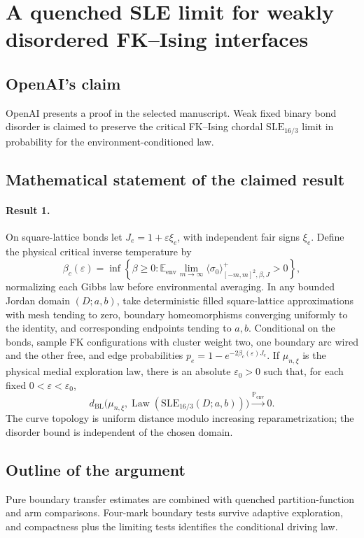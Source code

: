 \documentclass[11pt]{article}
\begin{document}
\section*{A quenched SLE limit for weakly disordered FK–Ising interfaces}

\subsection{OpenAI's claim}
OpenAI presents a proof in the selected manuscript. Weak fixed binary bond disorder is claimed to preserve the critical FK--Ising chordal $\mathrm{SLE}_{16/3}$ limit in probability for the environment-conditioned law.

\subsection{Mathematical statement of the claimed result}
\paragraph{Result 1.} On square-lattice bonds let $J_e=1+\varepsilon\xi_e$, with independent fair signs $\xi_e$. Define the physical critical inverse temperature by
\[
 \beta_c(\varepsilon)=\inf\left\{\beta\ge0:
 \mathbb E_{\mathrm{env}}\lim_{m\to\infty}\langle\sigma_0\rangle^+_{[-m,m]^2,\beta,J}>0\right\},
\]
normalizing each Gibbs law before environmental averaging. In any bounded Jordan domain $(D;a,b)$, take deterministic filled square-lattice approximations with mesh tending to zero, boundary homeomorphisms converging uniformly to the identity, and corresponding endpoints tending to $a,b$. Conditional on the bonds, sample FK configurations with cluster weight two, one boundary arc wired and the other free, and edge probabilities $p_e=1-e^{-2\beta_c(\varepsilon)J_e}$. If $\mu_{n,\xi}$ is the physical medial exploration law, there is an absolute $\varepsilon_0>0$ such that, for each fixed $0<\varepsilon<\varepsilon_0$,
\[
 d_{\mathrm{BL}}\bigl(\mu_{n,\xi},\operatorname{Law}(\mathrm{SLE}_{16/3}(D;a,b))\bigr)
 \xrightarrow{\mathbb P_{\mathrm{env}}}0.
\]
The curve topology is uniform distance modulo increasing reparametrization; the disorder bound is independent of the chosen domain.

\subsection{Outline of the argument}
Pure boundary transfer estimates are combined with quenched partition-function and arm comparisons. Four-mark boundary tests survive adaptive exploration, and compactness plus the limiting tests identifies the conditional driving law.
\end{document}
